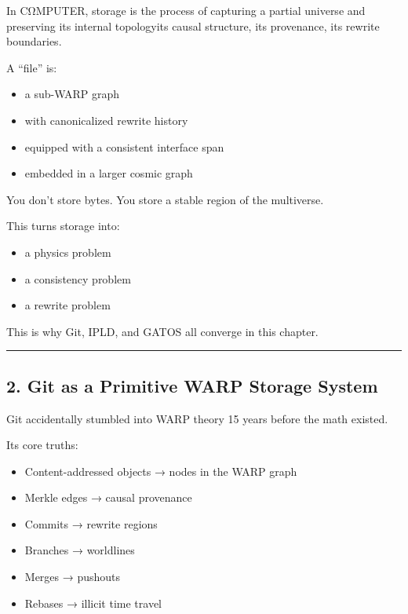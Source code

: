 In CΩMPUTER, storage is the process of capturing a partial universe and
preserving its internal topology\emd{}its causal structure, its provenance,
its rewrite boundaries.

A ``file'' is:

\begin{itemize}
\tightlist
\item
  a sub-WARP graph
\item
  with canonicalized rewrite history
\item
  equipped with a consistent interface span
\item
  embedded in a larger cosmic graph
\end{itemize}

You don't store bytes. You store a stable region of the multiverse.

This turns storage into:

\begin{itemize}
\tightlist
\item
  a physics problem
\item
  a consistency problem
\item
  a rewrite problem
\end{itemize}

This is why Git, IPLD, and GATOS all converge in this chapter.

\begin{center}\rule{0.5\linewidth}{0.5pt}\end{center}

\subsection{2. Git as a Primitive WARP Storage
System}\label{git-as-a-primitive-rmg-storage-system}

Git accidentally stumbled into WARP theory 15 years before the math
existed.

Its core truths:

\begin{itemize}
\tightlist
\item
  Content-addressed objects → nodes in the WARP graph
\item
  Merkle edges → causal provenance
\item
  Commits → rewrite regions
\item
  Branches → worldlines
\item
  Merges → pushouts
\item
  Rebases → illicit time travel
\end{itemize}

